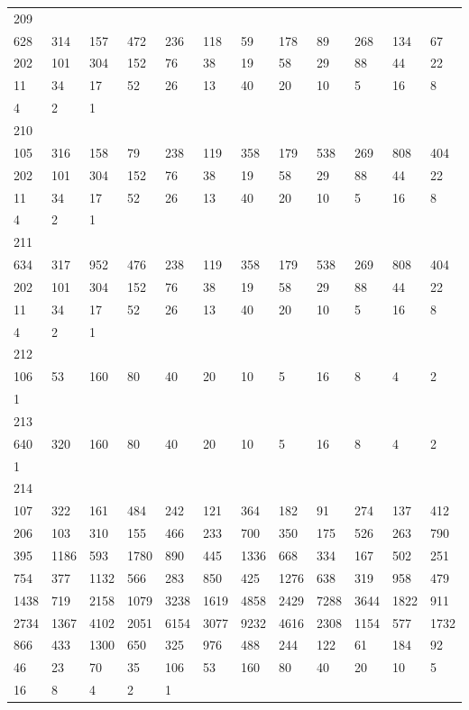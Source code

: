 \begin{longtable}{llllllllllll}
209&&&&&&&&&&&\\
628& 314& 157& 472& 236& 118& 59& 178& 89& 268& 134& 67\\
202& 101& 304& 152& 76& 38& 19& 58& 29& 88& 44& 22\\
11& 34& 17& 52& 26& 13& 40& 20& 10& 5& 16& 8\\
4& 2& 1& \\

210&&&&&&&&&&&\\
105& 316& 158& 79& 238& 119& 358& 179& 538& 269& 808& 404\\
202& 101& 304& 152& 76& 38& 19& 58& 29& 88& 44& 22\\
11& 34& 17& 52& 26& 13& 40& 20& 10& 5& 16& 8\\
4& 2& 1& \\

211&&&&&&&&&&&\\
634& 317& 952& 476& 238& 119& 358& 179& 538& 269& 808& 404\\
202& 101& 304& 152& 76& 38& 19& 58& 29& 88& 44& 22\\
11& 34& 17& 52& 26& 13& 40& 20& 10& 5& 16& 8\\
4& 2& 1& \\

212&&&&&&&&&&&\\
106& 53& 160& 80& 40& 20& 10& 5& 16& 8& 4& 2\\
1& \\

213&&&&&&&&&&&\\
640& 320& 160& 80& 40& 20& 10& 5& 16& 8& 4& 2\\
1& \\

214&&&&&&&&&&&\\
107& 322& 161& 484& 242& 121& 364& 182& 91& 274& 137& 412\\
206& 103& 310& 155& 466& 233& 700& 350& 175& 526& 263& 790\\
395& 1186& 593& 1780& 890& 445& 1336& 668& 334& 167& 502& 251\\
754& 377& 1132& 566& 283& 850& 425& 1276& 638& 319& 958& 479\\
1438& 719& 2158& 1079& 3238& 1619& 4858& 2429& 7288& 3644& 1822& 911\\
2734& 1367& 4102& 2051& 6154& 3077& 9232& 4616& 2308& 1154& 577& 1732\\
866& 433& 1300& 650& 325& 976& 488& 244& 122& 61& 184& 92\\
46& 23& 70& 35& 106& 53& 160& 80& 40& 20& 10& 5\\
16& 8& 4& 2& 1& \\


\end{longtable}
